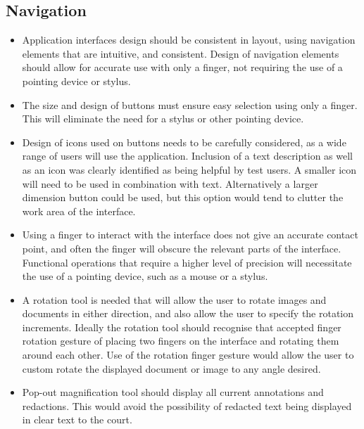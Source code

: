 \subsection{Navigation}
\begin{itemize}
   

    \item Application interfaces design should be consistent in layout, using navigation elements that are intuitive, and consistent. Design of navigation elements should allow for accurate use with only a finger, not requiring the use of a pointing device or stylus.
    \item The size and design of buttons must ensure easy selection using only a finger. This will eliminate the need for a stylus or other pointing device.
    \item Design of icons used on buttons needs to be carefully considered, as a wide range of users will use the application. Inclusion of a text description as well as an icon was clearly identified as being helpful by test users. A smaller icon will need to be used in combination with text. Alternatively a larger dimension button could be used, but this option would tend to clutter the work area of the interface.
    \item Using a finger to interact with the interface does not give an accurate contact point, and often the finger will obscure the relevant parts of the interface. Functional operations that require a higher level of precision will necessitate the use of a pointing device, such as a mouse or a stylus.
    \item A rotation tool is needed that will allow the user to rotate images and documents in either direction, and also allow the user to specify the rotation increments. Ideally the rotation tool should recognise that accepted finger rotation gesture of placing two fingers on the interface and rotating them around each other. Use of the rotation finger gesture would allow the user to custom rotate the displayed document or image to any angle desired.
    \item Pop-out magnification tool should display all current annotations and redactions. This would avoid the possibility of redacted text being displayed in clear text to the court.
\end{itemize}
